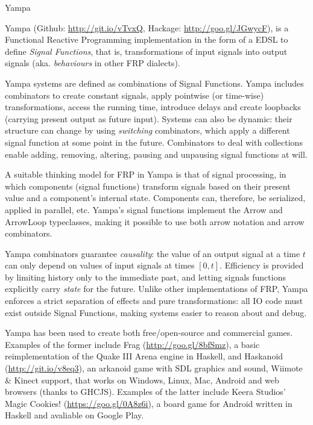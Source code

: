 \begin{hcarentry}[updated]{Yampa}
\label{yampa}
\makeheader

Yampa (Github: \href{http://git.io/vTvxQ}{http://git.io/vTvxQ}, Hackage:
\href{http://goo.gl/JGwycF}{http://goo.gl/JGwycF}), is a Functional Reactive
Programming implementation in the form of a EDSL to define \emph{Signal
Functions}, that is, transformations of input signals into output signals (aka.
\emph{behaviours} in other FRP dialects). 

Yampa systems are defined as combinations of Signal Functions.  Yampa includes
combinators to create constant signals, apply  pointwise (or time-wise)
transformations, access the running time, introduce delays and create loopbacks
(carrying present output as future input). Systems can also be dynamic: their
structure can change by using \emph{switching} combinators, which apply a
different signal function at some point in the future. Combinators to deal with
collections enable adding, removing, altering, pausing and
unpausing signal functions at will.

A suitable thinking model for FRP in Yampa is that of signal processing, in
which components (signal functions) transform signals based on their present
value and a component's internal state. Components can, therefore, be
serialized, applied in parallel, etc. Yampa's signal functions implement the
Arrow and ArrowLoop typeclasses, making it possible to use both arrow
notation and arrow combinators. 

Yampa combinators guarantee \emph{causality}: the value of an output signal at
a time $t$ can only depend on values of input signals at times $[0,t]$.
Efficiency is provided by limiting history only to the immediate past, and
letting signals functions explicitly carry \emph{state} for the future.  Unlike
other implementations of FRP, Yampa enforces a strict separation of effects and
pure transformations: all IO code must exist outside Signal Functions,
making systems easier to reason about and debug.

Yampa has been used to create both free/open-source and commercial games.
Examples of the former include Frag (\href{http://goo.gl/8bfSmz}{http://goo.gl/8bfSmz}), a basic
reimplementation of the Quake III Arena engine in Haskell, and Haskanoid
(\href{http://git.io/v8eq3}{http://git.io/v8eq3}), an arkanoid game with
SDL graphics and sound, Wiimote \& Kinect support, that works on Windows, Linux,
Mac, Android and web browsers (thanks to GHCJS). Examples of the latter include
Keera Studios' Magic Cookies!
(\href{https://goo.gl/0A8z6i}{https://goo.gl/0A8z6i}), a board game for Android
written in Haskell and avaliable on Google Play.


\end{hcarentry}
